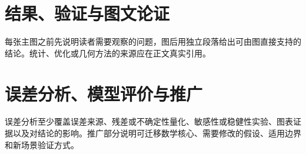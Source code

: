 \documentclass[UTF8,zihao=-4,a4paper]{ctexart}
\begin{document}
\section{结果、验证与图文论证}
每张主图之前先说明读者需要观察的问题，图后用独立段落给出可由图直接支持的结论。统计、优化或几何方法的来源应在正文真实引用\cite{sample2024}。

\section{误差分析、模型评价与推广}
误差分析至少覆盖误差来源、残差或不确定性量化、敏感性或稳健性实验、图表证据以及对结论的影响。推广部分说明可迁移数学核心、需要修改的假设、适用边界和新场景验证方式。

\label{mira-body-end}
\clearpage


\end{document}

